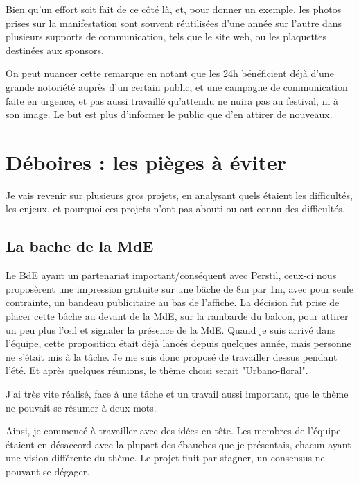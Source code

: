         Bien qu'un effort soit fait de ce côté là, et, pour donner un exemple, les photos prises sur la manifestation sont souvent réutilisées d'une année sur l'autre dans plusieurs supports de communication, tels que le site web, ou les plaquettes destinées aux sponsors.
        
        On peut nuancer cette remarque en notant que les 24h bénéficient déjà d'une grande notoriété auprès d'un certain public, et une campagne de communication faite en urgence, et pas aussi travaillé qu'attendu ne nuira pas au festival, ni à son image. Le but est plus d'informer le public que d'en attirer de nouveaux.
    
\section{Déboires : les pièges à éviter}

    Je vais revenir sur plusieurs gros projets, en analysant quels étaient les difficultés, les enjeux, et pourquoi ces projets n'ont pas abouti ou ont connu des difficultés.
    
    \subsection{La bache de la MdE}
    
        Le BdE ayant un partenariat important/conséquent avec Perstil, ceux-ci nous proposèrent une impression gratuite sur une bâche de 8m par 1m, avec pour seule contrainte, un bandeau publicitaire au bas de l'affiche. 
        La décision fut prise de placer cette bâche au devant de la MdE, sur la rambarde du balcon, pour attirer un peu plus l'œil et signaler la présence de la MdE.
        Quand je suis arrivé dans l'équipe, cette proposition était déjà lancés depuis quelques année, mais personne ne s'était mis à la tâche.
        Je me suis donc proposé de travailler dessus pendant l'été. Et après quelques réunions, le thème choisi serait "Urbano-floral".
        
        J'ai très vite réalisé, face à une tâche et un travail aussi important, que le thème ne pouvait se résumer à deux mots.
        
        Ainsi, je commencé à travailler avec des idées en tête. Les membres de l'équipe étaient en désaccord avec la plupart des ébauches que je présentais, chacun ayant une vision différente du thème. Le projet finit par stagner, un consensus ne pouvant se dégager.
        
